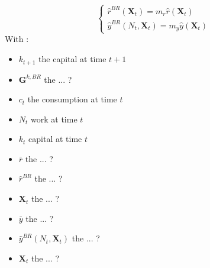 \documentclass{article}
\begin{document}
\begin{equation} \tag{49}
    \begin{cases}
        \hat{r}^{BR}(\textbf{X}_{t})=m_{r}\hat{r}(\textbf{X}_t) \\
        \hat{y}^{BR}(N_{t},\textbf{X}_{t})=m_y\hat{y}(\textbf{X}_{t})
    \end{cases}
\end{equation}
With : 
\begin{itemize}
    \item $k_{t+1}$ the capital at time $t+1$
    \item $\textbf{G}^{k,BR}$ the ... ?
    \item $c_t$ the consumption at time $t$
    \item $N_{t}$ work at time $t$
    \item $k_t$ capital at time $t$
    \item $\bar{r}$ the ... ?
    \item $\hat{r}^{BR}$ the ... ?
    \item $\textbf{X}_t$ the ... ?
    \item $\bar{y}$ the ... ?
    \item $\hat{y}^{BR}(N_t,\textbf{X}_{t})$ the ... ?
    \item $\textbf{X}_{t}$ the ... ?  
\end{itemize}
\end{document}
